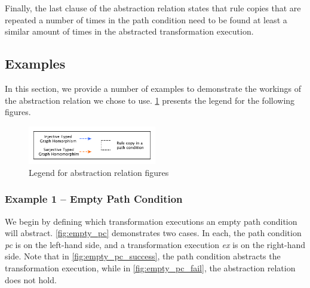 Finally, the last clause of the abstraction relation states that rule copies
that are repeated a number of times in the path condition need to be found at
least a similar amount of times in the abstracted transformation execution.






\subsection{Examples}

In this section, we provide a number of examples to demonstrate the workings of
the abstraction relation we chose to use. \cref{fig:legend} presents the legend
for the following figures.

\begin{figure}[htb]
 \centering
                \includegraphics[width=0.5\textwidth]{./figures/abstraction_relation/legend.pdf}
                \caption{Legend for abstraction relation figures}
                \label{fig:legend}
\end{figure}
                
\subsubsection{Example 1 -- Empty Path Condition}

We begin by defining which transformation executions an empty path condition
will abstract. \cref{fig:empty_pc} demonstrates two cases. In each, the path
condition \textit{pc} is on the left-hand side, and a transformation execution \textit{ex} is on the
right-hand side. Note that in \cref{fig:empty_pc_success}, the path condition
abstracts the transformation execution, while in \cref{fig:empty_pc_fail}, the
abstraction relation does not hold.

